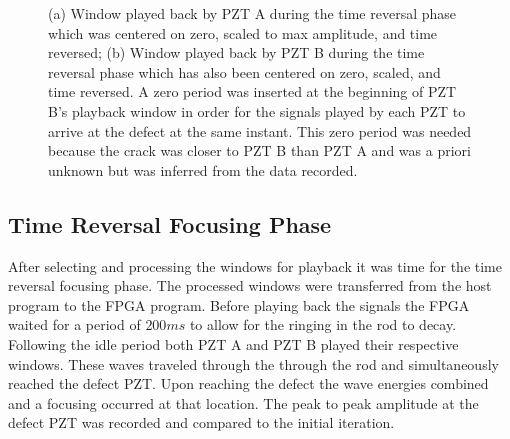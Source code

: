 \begin{figure}
\begin{subfigmatrix}{2}
\end{subfigmatrix}

  \caption
  { \label{fig:scaledSignals}
(a) Window played back by PZT A during the time reversal phase which was centered on zero, scaled to max amplitude, and time reversed;
(b) Window played back by PZT B during the time reversal phase which has also been centered on zero, scaled, and time reversed. A zero period was inserted at the beginning of PZT B's playback window in order for the signals played by each PZT to arrive at the defect at the same instant. This zero period was needed because the crack was closer to PZT B than PZT A and was a priori unknown but was inferred from the data recorded.
}
\end{figure}

\subsection{Time Reversal Focusing Phase}
After selecting and processing the windows for playback it was time for the time reversal focusing phase. The processed windows were transferred from the host program to the FPGA program. Before playing back the signals the FPGA waited for a period of $200ms$ to allow for the ringing in the rod to decay. Following the idle period both PZT A and PZT B played their respective windows. These waves traveled through the through the rod and simultaneously reached the defect PZT. Upon reaching the defect the wave energies combined and a focusing occurred at that location. The peak to peak amplitude at the defect PZT was recorded and compared to the initial iteration.

